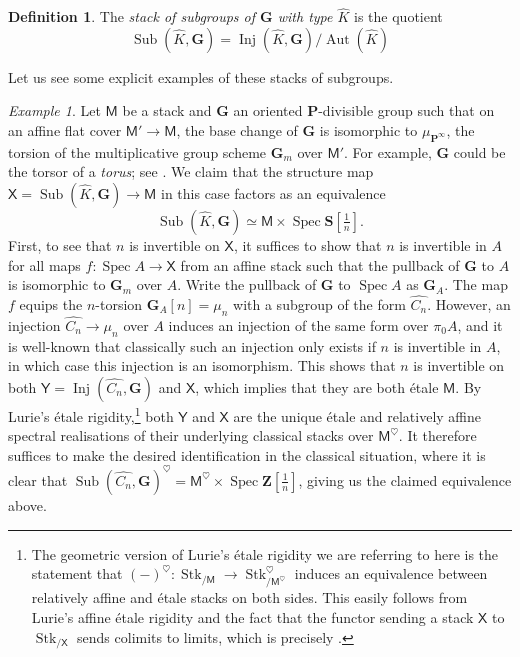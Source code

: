 \documentclass[11pt, a4paper]{article}
\DeclareMathOperator{\Spec}{Spec}
\newcommand{\1}{\mathbf{1}}
\newcommand{\Sph}{\mathbf{S}}
\DeclareMathOperator{\Inj}{Inj}
\DeclareMathOperator{\Sub}{Sub}
\DeclareMathOperator{\Stk}{Stk}
\DeclareMathOperator{\Aut}{Aut}
\newcommand{\dual}[1]{{\widehat{#1}}}
\newcommand{\G}{\mathbf{G}}
\newcommand{\M}{\mathsf{M}}
\renewcommand{\P}{\mathbf{P}}
\newcommand{\X}{\mathsf{X}}
\newcommand{\Y}{\mathsf{Y}}
\newcommand{\Z}{\mathbf{Z}}
\theoremstyle{plain}
\theoremstyle{definition}
\newtheorem{mydef}[equation]{Definition}
\theoremstyle{remark}\numberwithin{equation}{section}
\newtheorem{example}[equation]{Example}
\begin{document}
\begin{mydef}\label{df:moduli_stack_of_subgroups}
    The \emph{stack of subgroups of $\G$ with type $\dual{K}$} is the quotient
    \[\Sub(\dual{K}, \G) = \Inj(\dual{K}, \G) / \Aut(\dual{K})\]
\end{mydef}

Let us see some explicit examples of these stacks of subgroups.

\begin{example}\label{ex:subforKO}
    Let $\M$ be a stack and $\G$ an oriented $\P$-divisible group such that on an affine flat cover $\M' \to \M$, the base change of $\G$ is isomorphic to $\mu_{\P^\infty}$, the torsion of the multiplicative group scheme $\G_m$ over $\M'$. For example, $\G$ could be the torsor of a \emph{torus}; see . We claim that the structure map $\X = \Sub(\dual{K}, \G) \to \M$ in this case factors as an equivalence
    \[\Sub(\dual{K}, \G) \simeq \M \times \Spec \Sph[\tfrac{1}{n}].\]
    First, to see that $n$ is invertible on $\X$, it suffices to show that $n$ is invertible in $A$ for all maps $f \colon \Spec A \to \X$ from an affine stack such that the pullback of $\G$ to $A$ is isomorphic to $\G_m$ over $A$. Write the pullback of $\G$ to $\Spec A$ as $\G_A$. The map $f$ equips the $n$-torsion $\G_A[n] = \mu_n$ with a subgroup of the form $\dual{C_n}$. However, an injection $\dual{C_n} \to \mu_n$ over $A$ induces an injection of the same form over $\pi_0 A$, and it is well-known that classically such an injection only exists if $n$ is invertible in $A$, in which case this injection is an isomorphism. This shows that $n$ is invertible on both $\Y = \Inj(\dual{C_n}, \G)$ and $\X$, which implies that they are both étale $\M$. By Lurie's étale rigidity,\footnote{The geometric version of Lurie's étale rigidity we are referring to here is the statement that $(-)^\heartsuit\colon \Stk_{/\M} \to \Stk^\heartsuit_{/\M^\heartsuit}$ induces an equivalence between relatively affine and étale stacks on both sides. This easily follows from Lurie's affine étale rigidity \cite[Th.7.5.4.2]{ha} and the fact that the functor sending a stack $\X$ to $\Stk_{/\X}$ sends colimits to limits, which is precisely \cite[Pr.2.1.2.9(4)]{reconstruction}.} both $\Y$ and $\X$ are the unique étale and relatively affine spectral realisations of their underlying classical stacks over $\M^\heartsuit$. It therefore suffices to make the desired identification in the classical situation, where it is clear that $\Sub(\dual{C_n}, \G)^\heartsuit = \M^\heartsuit \times \Spec \Z[\tfrac{1}{n}]$, giving us the claimed equivalence above.
\end{example}
\end{document}
